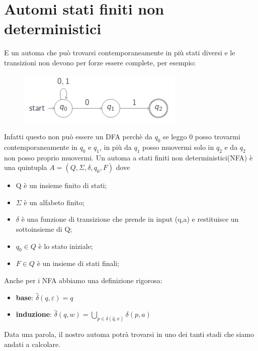 \chapter{Automi stati finiti non deterministici}
E un automa che può trovarsi contemporaneamente in più stati diversi e le 
transizioni non devono per forze essere complete, per esempio: 

\begin{figure}[h]
\centering 
\includegraphics[scale=0.5]{Immagini/NFA.png}
\end{figure}

Infatti questo non può essere un DFA perchè da $q_0$ se leggo 0 posso trovarmi
contemporaneamente in $q_0$ e $q_1$, in più da $q_1$ posso muovermi solo in $q_2$ 
e da $q_2$ non posso proprio muovermi.
Un automa a stati finiti non deterministici(NFA) è una quintupla $A=(Q, \Sigma, 
\delta, q_0, F)$ dove
\begin{itemize}
\item Q è un insieme finito di stati;
\item $\Sigma$ è un alfabeto finito;
\item $\delta$ è una funzione di transizione che prende in input (q,a) e 
restituisce un sottoinsieme di Q;
\item $q_0 \in Q$ è lo stato iniziale;
\item $F \in Q$ è un insieme di stati finali;
\end{itemize}
Anche per i NFA abbiamo una definizione rigorosa:
\begin{itemize}
\item \textbf{base}: $\widehat{\delta}(q, \varepsilon)={q}$
\item \textbf{induzione}: $\widehat{\delta}(q,w)=\bigcup_{p \in \delta 
(\widehat{q},x)}^{} \delta(p,a)$
\end{itemize}
Data una parola, il nostro automa potrà trovarsi in uno dei tanti stadi
che siamo andati a calcolare.